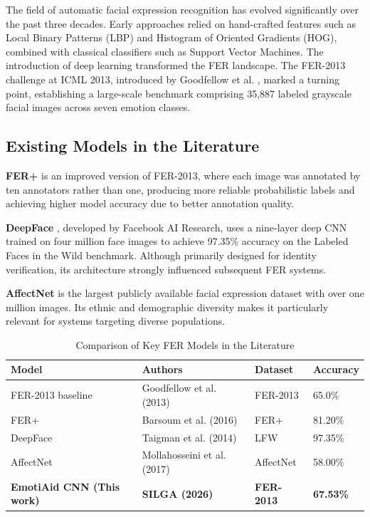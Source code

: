 \documentclass[a4paper,12pt,oneside]{report}
\begin{document}
The field of automatic facial expression recognition has evolved significantly
over the past three decades. Early approaches relied on hand-crafted features
such as Local Binary Patterns (LBP) and Histogram of Oriented Gradients (HOG),
combined with classical classifiers such as Support Vector Machines. The
introduction of deep learning transformed the FER landscape. The FER-2013
challenge at ICML 2013, introduced by Goodfellow et al. \cite{goodfellow2013},
marked a turning point, establishing a large-scale benchmark comprising 35,887
labeled grayscale facial images across seven emotion classes.

\subsection{Existing Models in the Literature}

\textbf{FER+} \cite{barsoum2016} is an improved version of FER-2013, where each
image was annotated by ten annotators rather than one, producing more reliable
probabilistic labels and achieving higher model accuracy due to better annotation
quality.

\textbf{DeepFace} \cite{taigman2014}, developed by Facebook AI Research, uses a
nine-layer deep CNN trained on four million face images to achieve 97.35\%
accuracy on the Labeled Faces in the Wild benchmark. Although primarily designed
for identity verification, its architecture strongly influenced subsequent FER
systems.

\textbf{AffectNet} \cite{mollahosseini2017} is the largest publicly available
facial expression dataset with over one million images. Its ethnic and demographic
diversity makes it particularly relevant for systems targeting diverse populations.

\begin{table}[H]
\centering
\caption{Comparison of Key FER Models in the Literature}
\begin{tabular}{|l|l|l|l|}
\hline
\textbf{Model} & \textbf{Authors} & \textbf{Dataset} & \textbf{Accuracy} \\
\hline
FER-2013 baseline & Goodfellow et al. (2013) & FER-2013 & 65.0\% \\
\hline
FER+ & Barsoum et al. (2016) & FER+ & 81.20\% \\
\hline
DeepFace & Taigman et al. (2014) & LFW & 97.35\% \\
\hline
AffectNet & Mollahosseini et al. (2017) & AffectNet & 58.00\% \\
\hline
\textbf{EmotiAid CNN (This work)} & \textbf{SILGA (2026)} & \textbf{FER-2013} & \textbf{67.53\%} \\
\hline
\end{tabular}
\label{tab:models}
\end{table}
\end{document}
